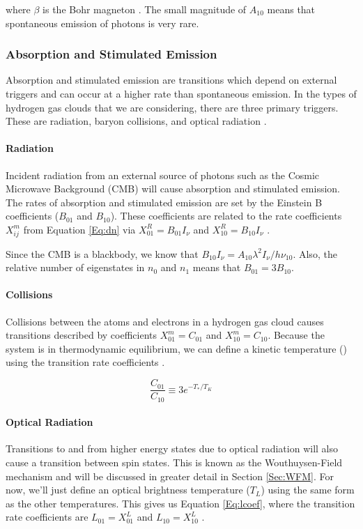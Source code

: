 where $\beta$ is the Bohr magneton \cite{field_1958}. The small magnitude of $A_{10}$ means that spontaneous emission of \cm photons is very rare. 

\subsubsection{Absorption and Stimulated Emission}
Absorption and stimulated emission are transitions which depend on external triggers and can occur at a higher rate than spontaneous emission. In the types of hydrogen gas clouds that we are considering, there are three primary triggers. These are \cm radiation, baryon collisions, and optical radiation \cite{field_1958}. 

\paragraph{\cm Radiation}
Incident radiation from an external source of \cm photons such as the Cosmic Microwave Background (CMB) will cause absorption and stimulated emission. The rates of absorption and stimulated emission are set by the Einstein B coefficients ($B_{01}$ and $B_{10}$). These coefficients are related to the rate coefficients $X^{m}_{ij}$ from Equation \ref{Eq:dn} via  $X^R_{01} = B_{01} I_\nu$ and $X^R_{10} = B_{10} I_{\nu}$ \cite{field_1958}. 

Since the CMB is a blackbody, we know that $B_{10} I_{\nu} = A_{10} \lambda^2 I_{\nu}/ h \nu_{10}$. Also, the relative number of eigenstates in $n_0$ and $n_1$ means that $B_{01} = 3 B_{10}$. 


\paragraph{Collisions}
Collisions between the atoms and electrons in a hydrogen gas cloud causes transitions described by coefficients $X^m_{01} = C_{01}$ and $X^m_{10} = C_{10}$. Because the system is in thermodynamic equilibrium, we can define a kinetic temperature (\tk) using the transition rate coefficients \cite{field_1958}. 

\begin{equation}
\frac{C_{01}}{C_{10}} \equiv 3 e^{-T_*/T_K}
\end{equation}

\paragraph{Optical Radiation}
Transitions to and from higher energy states due to optical radiation will also cause a transition between spin states. This is known as the Wouthuysen-Field mechanism \cite{wouthuysen_1952}\cite{field_1958} and will be discussed in greater detail in Section \ref{Sec:WFM}. For now, we'll just define an optical brightness temperature ($T_L$) using the same form as the other temperatures. This gives us Equation \ref{Eq:lcoef}, where the transition rate coefficients are $L_{01} = X^L_{01}$ and $L_{10} = X^L_{10}$ \cite{field_1958}. 

